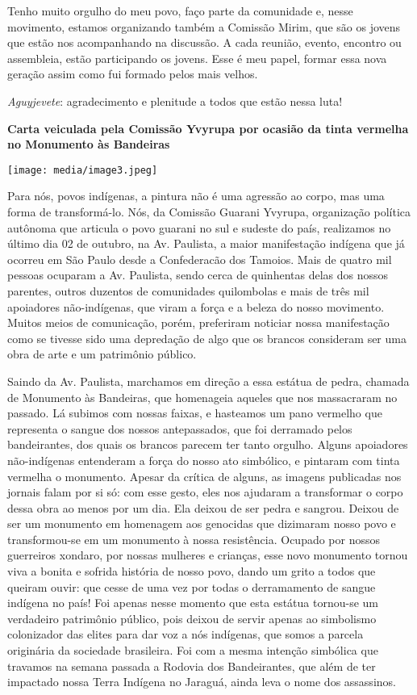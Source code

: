Tenho muito orgulho do meu povo, faço parte da comunidade e, nesse
movimento, estamos organizando também a Comissão Mirim, que são os
jovens que estão nos acompanhando na discussão. A cada reunião, evento,
encontro ou assembleia, estão participando os jovens. Esse é meu papel,
formar essa nova geração assim como fui formado pelos mais velhos.

\emph{Aguyjevete}: agradecimento e plenitude a todos que estão nessa
luta!

\textbf{Carta veiculada pela Comissão Yvyrupa por ocasião da tinta
vermelha no Monumento às Bandeiras }

\texttt{[image: media/image3.jpeg]}

Para nós, povos indígenas, a pintura não é uma agressão ao corpo, mas
uma forma de transformá-lo. Nós, da Comissão Guarani Yvyrupa,
organização política autônoma que articula o povo guarani no sul e
sudeste do país, realizamos no último dia 02 de outubro, na Av.
Paulista, a maior manifestação indígena que já ocorreu em São Paulo
desde a Confederacão dos Tamoios. Mais de quatro mil pessoas ocuparam a
Av. Paulista, sendo cerca de quinhentas delas dos nossos parentes,
outros duzentos de comunidades quilombolas e mais de três mil apoiadores
não-indígenas, que viram a força e a beleza do nosso movimento. Muitos
meios de comunicação, porém, preferiram noticiar nossa manifestação como
se tivesse sido uma depredação de algo que os brancos consideram ser uma
obra de arte e um patrimônio público.

Saindo da Av. Paulista, marchamos em direção a essa estátua de pedra,
chamada de Monumento às Bandeiras, que homenageia aqueles que nos
massacraram no passado. Lá subimos com nossas faixas, e hasteamos um
pano vermelho que representa o sangue dos nossos antepassados, que foi
derramado pelos bandeirantes, dos quais os brancos parecem ter tanto
orgulho. Alguns apoiadores não-indígenas entenderam a força do nosso ato
simbólico, e pintaram com tinta vermelha o monumento. Apesar da crítica
de alguns, as imagens publicadas nos jornais falam por si só: com esse
gesto, eles nos ajudaram a transformar o corpo dessa obra ao menos por
um dia. Ela deixou de ser pedra e sangrou. Deixou de ser um monumento em
homenagem aos genocidas que dizimaram nosso povo e transformou-se em um
monumento à nossa resistência. Ocupado por nossos guerreiros xondaro,
por nossas mulheres e crianças, esse novo monumento tornou viva a bonita
e sofrida história de nosso povo, dando um grito a todos que queiram
ouvir: que cesse de uma vez por todas o derramamento de sangue indígena
no país! Foi apenas nesse momento que esta estátua tornou-se um
verdadeiro patrimônio público, pois deixou de servir apenas ao
simbolismo colonizador das elites para dar voz a nós indígenas, que
somos a parcela originária da sociedade brasileira. Foi com a mesma
intenção simbólica que travamos na semana passada a Rodovia dos
Bandeirantes, que além de ter impactado nossa Terra Indígena no Jaraguá,
ainda leva o nome dos assassinos.

